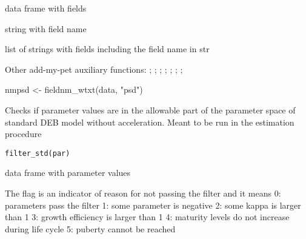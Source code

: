 \documentclass[a4paper]{book}
\begin{document}
%
\begin{Arguments}
\begin{ldescription}
\item[\code{data}] data frame with fields

\item[\code{str}] string with field name
\end{ldescription}
\end{Arguments}
%
\begin{Value}
list of strings with fields including the field name in str
\end{Value}
%
\begin{SeeAlso}\relax
Other add-my-pet auxiliary functions: ;
; ;
; ;
;
; 
\end{SeeAlso}
%
\begin{Examples}
\begin{ExampleCode}
nmpsd <- fieldnm_wtxt(data, "psd")
\end{ExampleCode}
\end{Examples}
%
\begin{Description}\relax
Checks if parameter values are in the allowable part of the parameter space of
standard DEB model without acceleration. Meant to be run in the estimation procedure
\end{Description}
%
\begin{Usage}
\begin{verbatim}
filter_std(par)
\end{verbatim}
\end{Usage}
%
\begin{Arguments}
\begin{ldescription}
\item[\code{par}] data frame with parameter values
\end{ldescription}
\end{Arguments}
%
\begin{Details}\relax
The flag is an indicator of reason for not passing the filter and it means
0: parameters pass the filter
1: some parameter is negative
2: some kappa is larger than 1
3: growth efficiency is larger than 1
4: maturity levels do not increase during life cycle
5: puberty cannot be reached
\end{Details}
\end{document}
